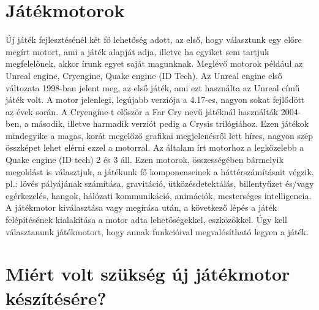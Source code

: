 \label{Chap:problemakor}








\section{Játékmotorok}

Új játék fejlesztésénél két fő lehetőség adott, az első, hogy választunk egy előre megírt motort, ami a játék alapját adja, illetve ha egyiket sem tartjuk megfelelőnek, akkor írunk egyet saját magunknak. Meglévő motorok például az Unreal engine, Cryengine, Quake engine (ID Tech). Az Unreal engine első változata 1998-ban jelent meg, az első játék, ami ezt használta az Unreal című játék volt. A motor jelenlegi, legújabb verziója a 4.17-es, nagyon sokat fejlődött az évek során. A Cryengine-t először a Far Cry nevű játéknál használták 2004-ben, a második, illetve harmadik verziót pedig a Crysis trilógiához. Ezen játékok mindegyike a magas, korát megelőző grafikai megjelenésről lett híres, nagyon szép összképet lehet elérni ezzel a motorral. Az általam írt motorhoz a legközelebb a Quake engine (ID tech) 2 és 3 áll.  Ezen motorok, összességében bármelyik megoldást is választjuk, a játékunk fő komponenseinek a háttérszámításait végzik, pl.: lövés pályájának számítása, gravitáció, ütközésdetektálás, billentyűzet és/vagy egérkezelés, hangok, hálózati kommunikáció, animációk, mesterséges intelligencia. A játékmotor kiválasztása vagy megírása után, a következő lépés a játék felépítésének kialakítása a motor adta lehetőségekkel, eszközökkel. Úgy kell választanunk játékmotort, hogy annak funkcióival megvalósítható legyen a játék.

\section{Miért volt szükség új játékmotor készítésére?}


